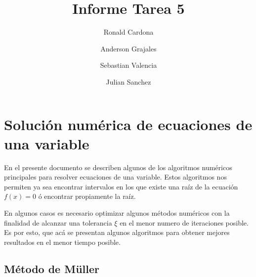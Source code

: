 \documentclass[12pt]{article}
\title{Informe Tarea 5}
\author {Ronald Cardona
\and Anderson Grajales
\and Sebastian Valencia
\and Julian Sanchez}
\begin{document}
\maketitle

\section{Solución numérica de ecuaciones de una variable}

En el presente documento se describen algunos de los algoritmos numéricos principales para resolver ecuaciones de una variable. Estos algoritmos nos permiten ya sea encontrar intervalos en los que existe una raíz de la ecuación $f(x) = 0$ ó encontrar propiamente la raíz.

En algunos casos es necesario optimizar algunos métodos numéricos con la finalidad de alcanzar una tolerancia $\xi$ en el menor numero de iteraciones posible. Es por esto, que acá se presentan algunos algoritmos para obtener mejores resultados en el menor tiempo posible.

\subsection{Método de Müller}
\end{document}
